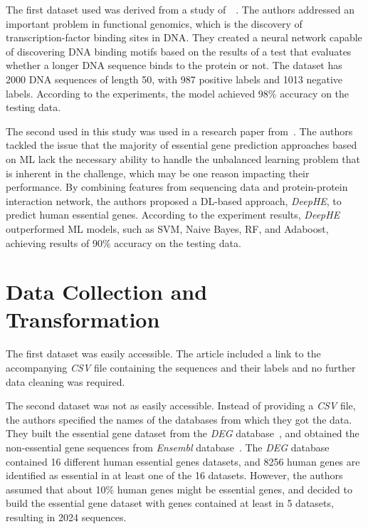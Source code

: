 The first dataset used was derived from a study of~\citeauthor{Zou2018AGenomics}~\cite{Zou2018AGenomics}. The authors addressed an important problem in functional genomics, which is the discovery of transcription-factor binding sites in \gls{DNA}. They created a neural network capable of discovering \gls{DNA} binding motifs based on the results of a test that evaluates whether a longer \gls{DNA} sequence binds to the protein or not. The dataset has 2000 \gls{DNA} sequences of length 50, with 987 positive labels and 1013 negative labels. According to the experiments, the model achieved 98\% accuracy on the testing data.

The second used in this study was used in a research paper from~\citeauthor{Zhang2020DeepHE:Learning}. The authors tackled the issue that the majority of essential gene prediction approaches based on \gls{ML} lack the necessary ability to handle the unbalanced learning problem that is inherent in the challenge, which may be one reason impacting their performance. By combining features from sequencing data and protein-protein interaction network, the authors proposed a \gls{DL}-based approach, \textit{DeepHE}, to predict human essential genes. According to the experiment results, \textit{DeepHE} outperformed \gls{ML} models, such as \gls{SVM}, Naive Bayes, \gls{RF}, and Adaboost, achieving results of 90\% accuracy on the testing data. 

\section{Data Collection and Transformation}

The first dataset was easily accessible. The article included a link to the accompanying \textit{CSV} file containing the sequences and their labels and no further data cleaning was required. 

The second dataset was not as easily accessible. Instead of providing a \textit{CSV} file, the authors specified the names of the databases from which they got the data. They built the essential gene dataset from the \textit{DEG} database~\cite{Luo2014DEGElements}, and obtained the non-essential gene sequences from \textit{Ensembl} database~\cite{Ruffier2017EnsemblAnnotation}. The \textit{DEG} database contained 16 different human essential genes datasets, and 8256 human genes are identified as essential in at least one of the 16 datasets. However, the authors assumed that about 10\% human genes might be essential genes, and decided to build the essential gene dataset with genes contained at least in 5 datasets, resulting in 2024 sequences.


